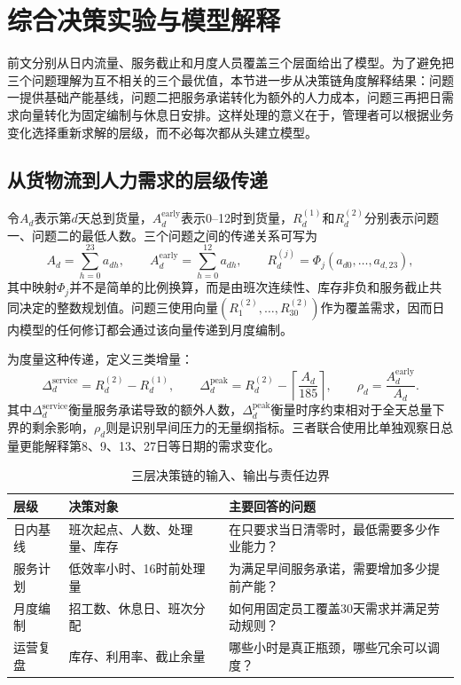 \section{综合决策实验与模型解释}

前文分别从日内流量、服务截止和月度人员覆盖三个层面给出了模型。为了避免把三个问题理解为互不相关的三个最优值，本节进一步从决策链角度解释结果：问题一提供基础产能基线，问题二把服务承诺转化为额外的人力成本，问题三再把日需求向量转化为固定编制与休息日安排。这样处理的意义在于，管理者可以根据业务变化选择重新求解的层级，而不必每次都从头建立模型。

\subsection{从货物流到人力需求的层级传递}

令$A_d$表示第$d$天总到货量，$A_d^{\mathrm{early}}$表示0--12时到货量，$R_d^{(1)}$和$R_d^{(2)}$分别表示问题一、问题二的最低人数。三个问题之间的传递关系可写为
\begin{equation}
 A_d=\sum_{h=0}^{23}a_{dh},\qquad
 A_d^{\mathrm{early}}=\sum_{h=0}^{12}a_{dh},\qquad
 R_d^{(j)}=\Phi_j(a_{d0},\ldots,a_{d,23}),
\end{equation}
其中映射$\Phi_j$并不是简单的比例换算，而是由班次连续性、库存非负和服务截止共同决定的整数规划值。问题三使用向量$(R_1^{(2)},\ldots,R_{30}^{(2)})$作为覆盖需求，因而日内模型的任何修订都会通过该向量传递到月度编制。

为度量这种传递，定义三类增量：
\begin{equation}
 \Delta_d^{\mathrm{service}}=R_d^{(2)}-R_d^{(1)},\qquad
 \Delta_d^{\mathrm{peak}}=R_d^{(2)}-\left\lceil\frac{A_d}{185}\right\rceil,
 \qquad
 \rho_d=\frac{A_d^{\mathrm{early}}}{A_d}.
\end{equation}
其中$\Delta_d^{\mathrm{service}}$衡量服务承诺导致的额外人数，$\Delta_d^{\mathrm{peak}}$衡量时序约束相对于全天总量下界的剩余影响，$\rho_d$则是识别早间压力的无量纲指标。三者联合使用比单独观察日总量更能解释第8、9、13、27日等日期的需求变化。

\begin{table}[htbp]
\centering
\caption{三层决策链的输入、输出与责任边界}
\label{tab:decision-chain}
\begin{tabular}{p{}p{}p{}}
\toprule
层级 & 决策对象 & 主要回答的问题\\
\midrule
日内基线 & 班次起点、人数、处理量、库存 & 在只要求当日清零时，最低需要多少作业能力？\\
服务计划 & 低效率小时、16时前处理量 & 为满足早间服务承诺，需要增加多少提前产能？\\
月度编制 & 招工数、休息日、班次分配 & 如何用固定员工覆盖30天需求并满足劳动规则？\\
运营复盘 & 库存、利用率、截止余量 & 哪些小时是真正瓶颈，哪些冗余可以调度？\\
\bottomrule
\end{tabular}
\end{table}

